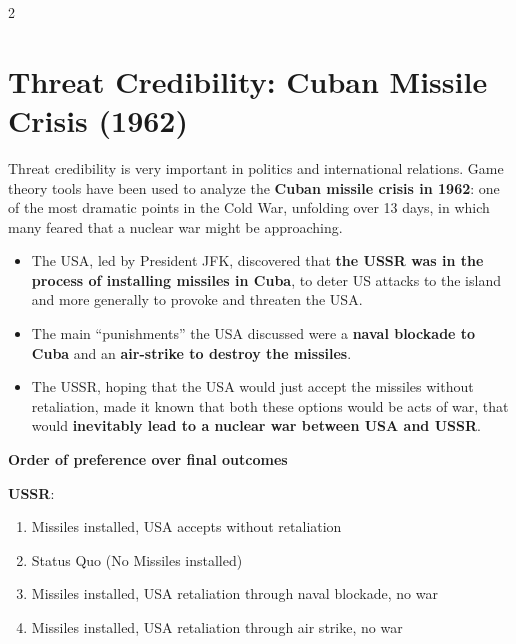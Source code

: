 \documentclass[a4paper,9pt]{extarticle}
\begin{document}
\begin{multicols}{2}
\section{Threat Credibility: Cuban Missile Crisis (1962)}


Threat credibility is very important in politics and international relations. Game theory
tools have been used to analyze the \textbf{Cuban missile crisis in 1962}: one of the most
dramatic points in the Cold War, unfolding over 13 days, in which many feared that a nuclear
war might be approaching.


\begin{example}

\begin{itemize}

\item The USA, led by President JFK, discovered that \textbf{the USSR was in the process of
installing missiles in Cuba}, to deter US attacks to the island and more generally to provoke
and threaten the USA.

\item The main ``punishments'' the USA discussed were a \textbf{naval blockade to Cuba} and
an \textbf{air-strike to destroy the missiles}.

\item The USSR, hoping that the USA would just accept the missiles without retaliation, made
it known that both these options would be acts of war, that would \textbf{inevitably lead to
a nuclear war between USA and USSR}.

\end{itemize}

\end{example}


\textbf{Order of preference over final outcomes}

\textbf{USSR}:

\begin{enumerate}

\item Missiles installed, USA accepts without retaliation

\item Status Quo (No Missiles installed)

\item Missiles installed, USA retaliation through naval blockade, no war

\item Missiles installed, USA retaliation through air strike, no war


\end{enumerate}
\end{multicols}
\end{document}

